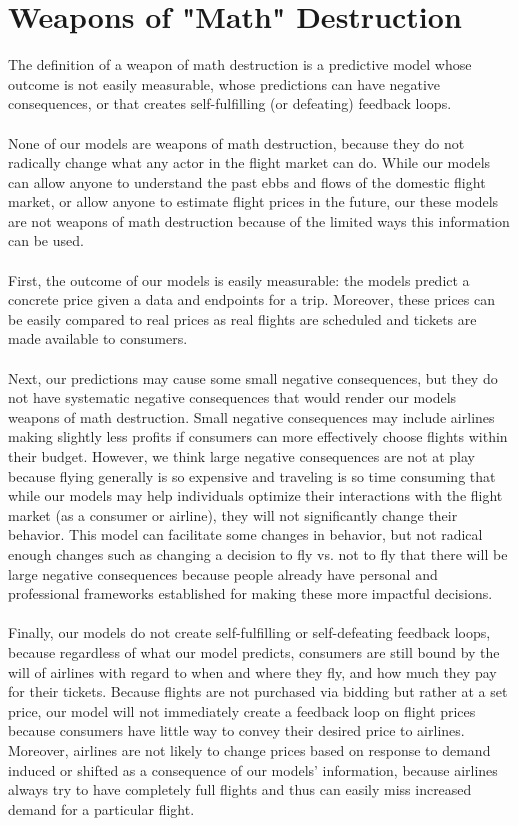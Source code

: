 \documentclass{article}
\begin{document}
\section{Weapons of "Math" Destruction}
The definition of a weapon of math destruction is a predictive model whose outcome is not easily measurable, whose predictions can have negative consequences, or that creates self-fulfilling (or defeating) feedback loops.\\\\
None of our models are  weapons of math destruction, because they do not radically change what any actor in the flight market can do. While our models can allow anyone to understand the past ebbs and flows of the domestic flight market, or allow anyone to estimate flight prices in the future, our these models are not weapons of math destruction because of the limited ways this information can be used.\\\\
First, the outcome of our models is easily measurable: the models predict a concrete price given a data and endpoints for a trip. Moreover, these prices can be easily compared to real prices as real flights are scheduled and tickets are made available to consumers.\\\\
Next, our predictions may cause some small negative consequences, but they do not have systematic negative consequences that would render our models weapons of math destruction. Small negative consequences may include airlines making slightly less profits if consumers can more effectively choose flights within their budget. However, we think large negative consequences are not at play because flying generally is so expensive and traveling is so time consuming that while our models may help individuals optimize their interactions with the flight market (as a consumer or airline), they will not significantly change their behavior. This model can facilitate some changes in behavior, but not radical enough changes such as changing a decision to fly vs. not to fly that there will be large negative consequences because people already have personal and professional frameworks established for making these more impactful decisions. \\\\
Finally, our models do not create self-fulfilling or self-defeating feedback loops, because regardless of what our model predicts, consumers are still bound by the will of airlines with regard to when and where they fly, and how much they pay for their tickets. Because flights are not purchased via bidding but rather at a set price, our model will not immediately create a feedback loop on flight prices because consumers have little way to convey their desired price to airlines. Moreover, airlines are not likely to change prices based on response to demand induced or shifted as a consequence of our models' information, because airlines always try to have completely full flights and thus can easily miss increased demand for a particular flight. 
\end{document}
